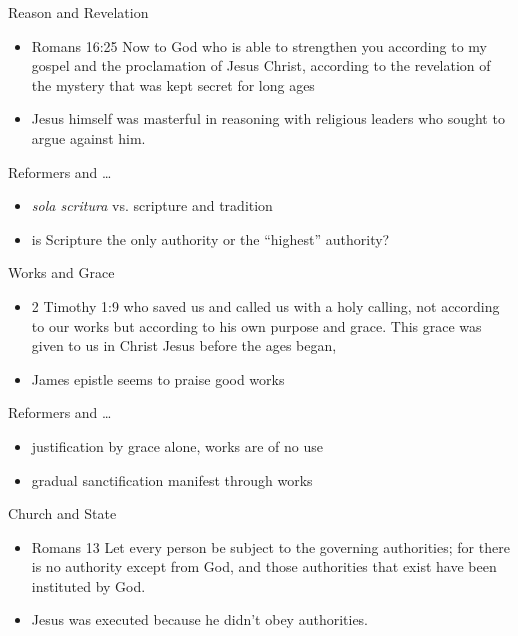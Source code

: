 \begin{frame}[label=sec-1-5]{Reason and Revelation}
\begin{itemize}
\item Romans 16:25  Now to God who is able to strengthen you according to my gospel and the proclamation of Jesus Christ, according to the revelation of the mystery that was kept secret for long ages
\item Jesus himself was masterful in reasoning with religious leaders who sought to argue against him.
\end{itemize}
\end{frame}

\begin{frame}[label=sec-1-6]{Reformers and \ldots{}}
\begin{itemize}
\item \emph{sola scritura} vs. scripture and tradition
\item is Scripture the only authority or the ``highest'' authority?
\end{itemize}
\end{frame}

\begin{frame}[label=sec-1-7]{Works and Grace}
\begin{itemize}
\item 2 Timothy 1:9 who saved us and called us with a holy calling, not according to our works but according to his own purpose and grace. This grace was given to us in Christ Jesus before the ages began,
\item James epistle seems to praise good works
\end{itemize}
\end{frame}

\begin{frame}[label=sec-1-8]{Reformers and \ldots{}}
\begin{itemize}
\item justification by grace alone, works are of no use
\item gradual sanctification manifest through works
\end{itemize}
\end{frame}
\begin{frame}[label=sec-1-9]{Church and State}
\begin{itemize}
\item Romans 13 Let every person be subject to the governing authorities; for there is no authority except from God, and those authorities that exist have been instituted by God.
\item Jesus was executed because he didn't obey authorities.
\end{itemize}
\end{frame}

